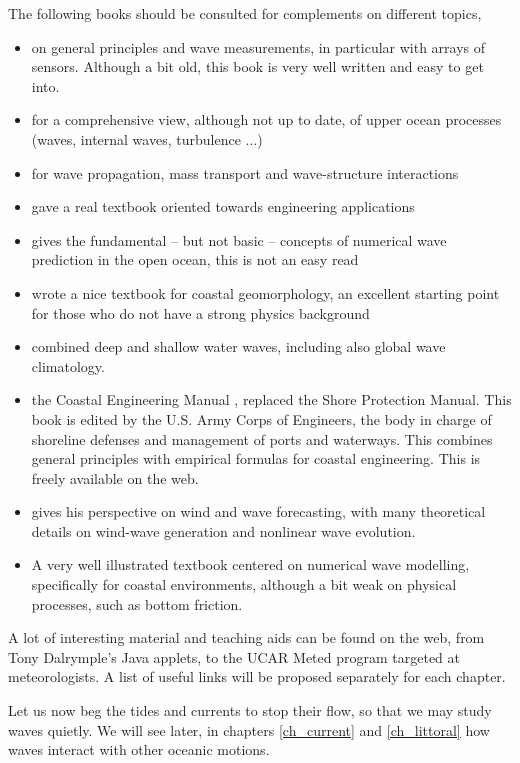 The following books should be consulted for complements on different topics, 
\begin{itemize}
\item \cite{Kinsman1965} on general principles and wave measurements, in particular with arrays of sensors. Although a bit 
old, this book is very well written and easy to get into. 
\item \cite{Phillips1977} for a comprehensive view, although not up to date, of upper ocean processes (waves, internal waves, turbulence ...) 
\item \cite{Mei1989} for wave propagation, mass transport and wave-structure interactions
\item \cite{Dean&Dalrymple1991} gave a real textbook oriented towards engineering applications
\item \cite{WAMBook} gives the fundamental -- but not basic -- concepts of numerical wave prediction 
in the open ocean, this is not an easy read
\item \cite{Komar1998} wrote a nice textbook for coastal geomorphology, an excellent starting point for those 
who do not have a strong physics background
\item \cite{Young1999}  combined deep and shallow water waves, including also global wave climatology. 
\item the Coastal Engineering Manual \citep{USACE2002}, replaced the Shore Protection Manual. This book 
is edited by the U.S. Army Corps of Engineers, the body in charge of shoreline defenses and management of 
ports and waterways. This combines general principles with empirical formulas for coastal engineering. This is 
freely available on the web. 
\item \cite{Janssen2004} gives his perspective on wind and wave forecasting, with many theoretical details on wind-wave 
generation and nonlinear wave evolution. 
\item \cite{Holthuijsen2007} A very well illustrated textbook centered on numerical wave modelling, specifically for coastal 
environments, although a bit weak on physical processes, such as bottom friction.  
\end{itemize}
A lot of interesting material and teaching aids can be found on the web, from Tony Dalrymple's Java applets, to the UCAR Meted program 
targeted at meteorologists. A list of useful links will be proposed separately for each chapter. 

Let us now beg the tides and currents to stop their flow, so that we may study waves quietly. We will see later, in chapters \ref{ch_current} and 
\ref{ch_littoral} how waves interact with other oceanic motions. 

